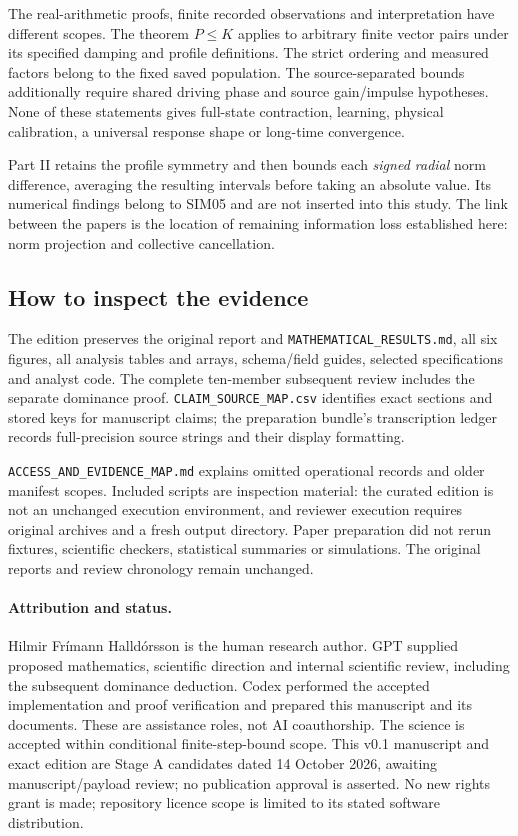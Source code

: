 \documentclass[11pt,a4paper]{article}
\begin{document}
The real-arithmetic proofs, finite recorded observations and interpretation have different scopes. The theorem $P\le K$ applies to arbitrary finite vector pairs under its specified damping and profile definitions. The strict ordering and measured factors belong to the fixed saved population. The source-separated bounds additionally require shared driving phase and source gain/impulse hypotheses. None of these statements gives full-state contraction, learning, physical calibration, a universal response shape or long-time convergence.

Part II \cite{parttwo} retains the profile symmetry and then bounds each \emph{signed radial} norm difference, averaging the resulting intervals before taking an absolute value. Its numerical findings belong to SIM05 and are not inserted into this study. The link between the papers is the location of remaining information loss established here: norm projection and collective cancellation.

\subsection{How to inspect the evidence}
The edition preserves the original report and \texttt{MATHEMATICAL\_RESULTS.md}, all six figures, all analysis tables and arrays, schema/field guides, selected specifications and analyst code. The complete ten-member subsequent review includes the separate dominance proof. \texttt{CLAIM\_SOURCE\_MAP.csv} identifies exact sections and stored keys for manuscript claims; the preparation bundle's transcription ledger records full-precision source strings and their display formatting.

\texttt{ACCESS\_AND\_EVIDENCE\_MAP.md} explains omitted operational records and older manifest scopes. Included scripts are inspection material: the curated edition is not an unchanged execution environment, and reviewer execution requires original archives and a fresh output directory. Paper preparation did not rerun fixtures, scientific checkers, statistical summaries or simulations. The original reports and review chronology remain unchanged.

\paragraph{Attribution and status.} Hilmir Frímann Halldórsson is the human research author. GPT supplied proposed mathematics, scientific direction and internal scientific review, including the subsequent dominance deduction. Codex performed the accepted implementation and proof verification and prepared this manuscript and its documents. These are assistance roles, not AI coauthorship. The science is accepted within conditional finite-step-bound scope. This v0.1 manuscript and exact edition are Stage A candidates dated 14 October 2026, awaiting manuscript/payload review; no publication approval is asserted. No new rights grant is made; repository licence scope is limited to its stated software distribution.
\end{document}
